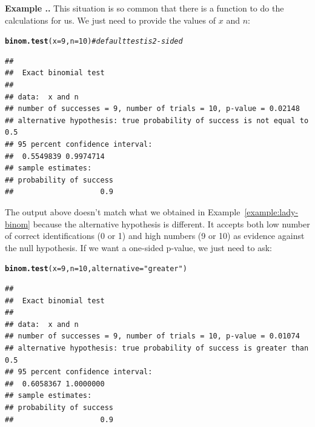 \documentclass[twoside]{book}\usepackage[]{graphicx}\usepackage[]{xcolor}
\makeatletter
\newcommand{\hlnum}[1]{\textcolor[rgb]{0.686,0.059,0.569}{#1}}%
\newcommand{\hlstr}[1]{\textcolor[rgb]{0.192,0.494,0.8}{#1}}%
\newcommand{\hlcom}[1]{\textcolor[rgb]{0.678,0.584,0.686}{\textit{#1}}}%
\newcommand{\hlstd}[1]{\textcolor[rgb]{0.345,0.345,0.345}{#1}}%
\newcommand{\hlkwc}[1]{\textcolor[rgb]{0.333,0.667,0.333}{#1}}%
\newcommand{\hlkwd}[1]{\textcolor[rgb]{0.737,0.353,0.396}{\textbf{#1}}}%
\newenvironment{kframe}{%
 \def\at@end@of@kframe{}%
 \ifinner\ifhmode%
  \def\at@end@of@kframe{\end{minipage}}%
  \begin{minipage}{\columnwidth}%
 \fi\fi%
 \def\FrameCommand##1{\hskip\@totalleftmargin \hskip-\fboxsep
 \colorbox{shadecolor}{##1}\hskip-\fboxsep
     \hskip-\linewidth \hskip-\@totalleftmargin \hskip\columnwidth}%
 \MakeFramed {\advance\hsize-\width
   \@totalleftmargin\z@ \linewidth\hsize
   \@setminipage}}%
 {\par\unskip\endMakeFramed%
 \at@end@of@kframe}
\newenvironment{knitrout}{}{} %
\newcounter{example}[section]
\newenvironment{example}%
{\refstepcounter{example}%
\textbf{Example \thesection.\arabic{example}. }}%
{}
\makeatother
\begin{document}
\begin{example}
	This situation is so common that there is a function to do the calculations for us.
	We just need to provide the values of $x$ and $n$:
\begin{knitrout}
\color{fgcolor}\begin{kframe}
\begin{alltt}
\hlkwd{binom.test}\hlstd{(}\hlkwc{x} \hlstd{=} \hlnum{9}\hlstd{,} \hlkwc{n} \hlstd{=} \hlnum{10}\hlstd{)}  \hlcom{# default test is 2-sided}
\end{alltt}
\begin{verbatim}
## 
## 	Exact binomial test
## 
## data:  x and n
## number of successes = 9, number of trials = 10, p-value = 0.02148
## alternative hypothesis: true probability of success is not equal to 0.5
## 95 percent confidence interval:
##  0.5549839 0.9974714
## sample estimates:
## probability of success 
##                    0.9
\end{verbatim}
\end{kframe}
\end{knitrout}
	The output above doesn't match what we obtained in Example~\ref{example:lady-binom}
	because the alternative hypothesis is different.  It accepts both low number of correct
	identifications (0 or 1) and high numbers (9 or 10) as evidence against the null
	hypothesis.  If we want a one-sided p-value, we just need to ask:
\begin{knitrout}
\color{fgcolor}\begin{kframe}
\begin{alltt}
\hlkwd{binom.test}\hlstd{(}\hlkwc{x} \hlstd{=} \hlnum{9}\hlstd{,} \hlkwc{n} \hlstd{=} \hlnum{10}\hlstd{,} \hlkwc{alternative} \hlstd{=} \hlstr{"greater"}\hlstd{)}
\end{alltt}
\begin{verbatim}
## 
## 	Exact binomial test
## 
## data:  x and n
## number of successes = 9, number of trials = 10, p-value = 0.01074
## alternative hypothesis: true probability of success is greater than 0.5
## 95 percent confidence interval:
##  0.6058367 1.0000000
## sample estimates:
## probability of success 
##                    0.9
\end{verbatim}
\end{kframe}
\end{knitrout}

\end{example}
\end{document}
